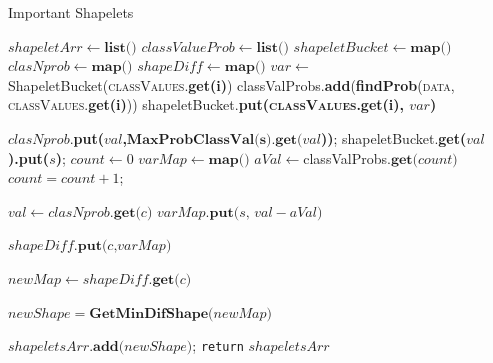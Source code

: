 \documentclass[letterpaper, 10 pt, conference]{IEEEtran}  %
\begin{document}
\begin{algorithm}
\caption{Important Shapelets}\label{euclid}
\begin{algorithmic}[ht]
\newcommand{\Map}{\textbf{map()}}
\newcommand{\List}{\textbf{list()}}
\State $shapeletArr \gets \List$
\State $classValueProb \gets \List$
\State $shapeletBucket \gets \Map$
\State $clasNprob \gets \Map$
\State $shapeDiff \gets \Map$
	\State $var \gets$ ShapeletBucket(\textsc{classValues}.\textbf {get(i)})
    \State classValProbs.\textbf{add}(\textbf{findProb}(\textsc{data}, \textsc{classValues}.\textbf {get(i)}))
    \State shapeletBucket.\textbf{put(\textsc{classValues}.\textbf {get(i)}, $var$)}
\EndFor

          

	         \State $clasNprob$.\textbf{put($val$,$ \textbf{MaxProbClassVal(s).get($val$}$))};
	         \State shapeletBucket.\textbf{get($val$).put($s$)};
	         \EndFor
\EndFor
\State $count \gets 0$
            \State $varMap \gets \Map $
            \State $aVal \gets $classValProbs$.\textbf{get($count$)}$
            \State $count = count +1$;

                \State $val  \gets clasNprob.\textbf{get($c$)}$
                \State $varMap.\textbf{put($s$, $val - aVal$)}$
            
            \State $shapeDiff.\textbf{put($c$,$varMap$)}$

            \State $newMap \gets shapeDiff.\textbf{get($c$)}$

            \State $newShape = \textbf{GetMinDifShape($newMap$)}$

            \State $shapeletsArr.\textbf{add($newShape$)}$;
            \EndFor
\EndFor
\State \texttt {return} $shapeletsArr$
\EndProcedure
\end{algorithmic}

\end{algorithm}
\end{document}
